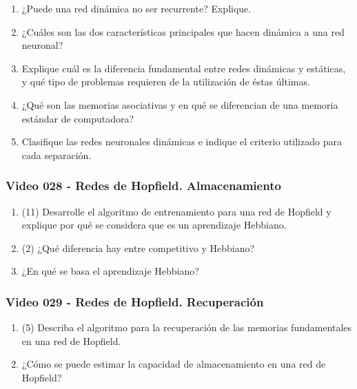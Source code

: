 \documentclass[a4paper,10pt,spanish,oneside]{article}
\begin{document}
\begin{enumerate}
\item ¿Puede una red dinámica no ser recurrente? Explique.

\item ¿Cuáles son las dos características principales que hacen dinámica a una red neuronal?

\item Explique cuál es la diferencia fundamental entre redes dinámicas y estáticas, y qué tipo de problemas requieren de la utilización de éstas últimas.

\item ¿Qué son las memorias asociativas y en qué se diferencian de una memoria estándar de computadora?

\item Clasifique las redes neuronales dinámicas e indique el criterio utilizado para cada separación.
\end{enumerate}

\subsubsection{Video 028 - Redes de Hopfield. Almacenamiento}

\begin{enumerate}
\item (11) Desarrolle el algoritmo de entrenamiento para una red de Hopfield y explique por qué se considera que es un aprendizaje Hebbiano.

\item (2) ¿Qué diferencia hay entre competitivo y Hebbiano?

\item ¿En qué se basa el aprendizaje Hebbiano?
\end{enumerate}

\subsubsection{Video 029 - Redes de Hopfield. Recuperación}

\begin{enumerate}
\item (5) Describa el algoritmo para la recuperación de las memorias fundamentales en una red de Hopfield.

\item ¿Cómo se puede estimar la capacidad de almacenamiento en una red de Hopfield?
\end{enumerate}
\end{document}
